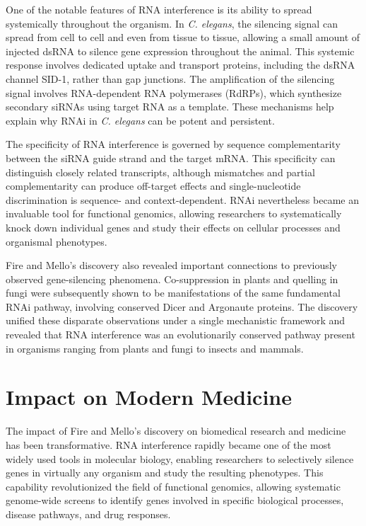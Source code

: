 One of the notable features of RNA interference is its ability to spread systemically throughout the organism. In \textit{C. elegans}, the silencing signal can spread from cell to cell and even from tissue to tissue, allowing a small amount of injected dsRNA to silence gene expression throughout the animal. This systemic response involves dedicated uptake and transport proteins, including the dsRNA channel SID-1, rather than gap junctions. The amplification of the silencing signal involves RNA-dependent RNA polymerases (RdRPs), which synthesize secondary siRNAs using target RNA as a template. These mechanisms help explain why RNAi in \textit{C. elegans} can be potent and persistent.

The specificity of RNA interference is governed by sequence complementarity between the siRNA guide strand and the target mRNA. This specificity can distinguish closely related transcripts, although mismatches and partial complementarity can produce off-target effects and single-nucleotide discrimination is sequence- and context-dependent. RNAi nevertheless became an invaluable tool for functional genomics, allowing researchers to systematically knock down individual genes and study their effects on cellular processes and organismal phenotypes.

Fire and Mello's discovery also revealed important connections to previously observed gene-silencing phenomena. Co-suppression in plants and quelling in fungi were subsequently shown to be manifestations of the same fundamental RNAi pathway, involving conserved Dicer and Argonaute proteins. The discovery unified these disparate observations under a single mechanistic framework and revealed that RNA interference was an evolutionarily conserved pathway present in organisms ranging from plants and fungi to insects and mammals.

\section{Impact on Modern Medicine}

The impact of Fire and Mello's discovery on biomedical research and medicine has been transformative. RNA interference rapidly became one of the most widely used tools in molecular biology, enabling researchers to selectively silence genes in virtually any organism and study the resulting phenotypes. This capability revolutionized the field of functional genomics, allowing systematic genome-wide screens to identify genes involved in specific biological processes, disease pathways, and drug responses.

